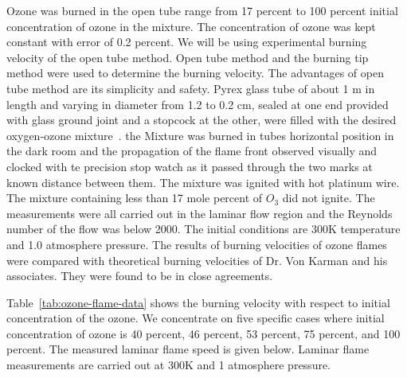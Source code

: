 Ozone was burned in the open tube
range from 17 percent to 100 percent initial concentration of ozone in
the mixture. 
The concentration of ozone was kept constant with error of 0.2
percent. We will be using experimental
burning velocity of the open tube method. Open tube method and the burning tip method were used to determine the burning velocity. The advantages of open tube method are its simplicity and safety. 
Pyrex glass tube of about 1 m in length and varying in diameter from 1.2 to 0.2 cm, sealed at one end provided with glass ground joint and a stopcock at the other, were filled with the desired oxygen-ozone mixture~\cite{Streng}.
the Mixture was burned in tubes horizontal position in the dark room and the propagation of the flame front observed visually and clocked with te precision stop watch as it passed through the two marks at known distance between them. The mixture was ignited with hot platinum wire. The mixture containing less than 17 mole percent of $O_3$ did not ignite.   The measurements were all carried out in the laminar
flow region and the Reynolds number of the flow was below 2000. The
initial conditions are 300K temperature and 1.0 atmosphere
pressure. The results of burning velocities of ozone flames were
compared with theoretical burning velocities of Dr. Von Karman and his
associates. They were found to be in close agreements.



Table~\ref{tab:ozone-flame-data} shows the burning
velocity with respect to initial concentration of the ozone. We
concentrate on five specific cases where initial concentration of ozone
is 40 percent, 46 percent, 53 percent, 75 percent, and 100 percent. The
measured laminar flame speed is given below. Laminar flame
measurements are carried out at 300K and 1 atmosphere pressure.


